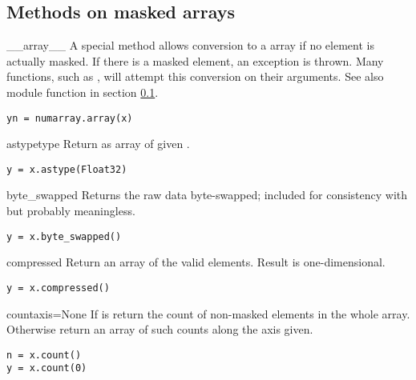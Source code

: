 \subsection{Methods on masked arrays}
\label{sec:numarray.ma:meth-mask-arrays}

\begin{methoddesc}[MaskedArray]{__array__}
   A special method allows conversion to a \module{\numarray} array if no
   element is actually masked. If there is a masked element, an
    exception is thrown. Many \module{\numarray}
   functions, such as , will attempt this conversion on
   their arguments. See also module function  in section
   \ref{sec:numarray.ma:meth-mask-arrays}.
\begin{verbatim}
yn = numarray.array(x)
\end{verbatim}
\end{methoddesc}

\begin{methoddesc}[MaskedArray]{astype}{type}
   Return  as array of given . 
\begin{verbatim}
y = x.astype(Float32)
\end{verbatim}
\end{methoddesc}

\begin{methoddesc}[MaskedArray]{byte_swapped}{}
   Returns the raw data \class{\numarray} byte-swapped; included for
   consistency with \module{\numarray} but probably meaningless. 
\begin{verbatim}
y = x.byte_swapped()
\end{verbatim}
\end{methoddesc}

\begin{methoddesc}[MaskedArray]{compressed}{}
   Return an array of the valid elements. Result is one-dimensional.  
\begin{verbatim}
y = x.compressed()
\end{verbatim}
\end{methoddesc}

\begin{methoddesc}[MaskedArray]{count}{axis=None}
   If  is  return the count of non-masked elements in
   the whole array.  Otherwise return an array of such counts along the axis
   given.
\begin{verbatim}
n = x.count()
y = x.count(0)
\end{verbatim}
\end{methoddesc}

